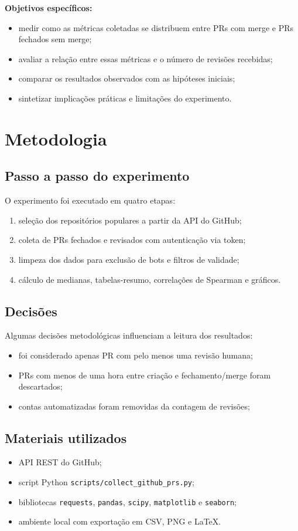 \documentclass[12pt,a4paper]{article}
\begin{document}
\textbf{Objetivos espec\'ificos:}
\begin{itemize}[leftmargin=1.5cm]
\item medir como as m\'etricas coletadas se distribuem entre PRs com merge e PRs fechados sem merge;
\item avaliar a rela\c{c}\~ao entre essas m\'etricas e o n\'umero de revis\~oes recebidas;
\item comparar os resultados observados com as hip\'oteses iniciais;
\item sintetizar implica\c{c}\~oes pr\'aticas e limita\c{c}\~oes do experimento.
\end{itemize}

\section{Metodologia}

\subsection{Passo a passo do experimento}
O experimento foi executado em quatro etapas:
\begin{enumerate}[leftmargin=1.5cm]
\item sele\c{c}\~ao dos reposit\'orios populares a partir da API do GitHub;
\item coleta de PRs fechados e revisados com autentica\c{c}\~ao via token;
\item limpeza dos dados para exclus\~ao de bots e filtros de validade;
\item c\'alculo de medianas, tabelas-resumo, correla\c{c}\~oes de Spearman e gr\'aficos.
\end{enumerate}

\subsection{Decis\~oes}
Algumas decis\~oes metodol\'ogicas influenciam a leitura dos resultados:
\begin{itemize}[leftmargin=1.5cm]
\item foi considerado apenas PR com pelo menos uma revis\~ao humana;
\item PRs com menos de uma hora entre cria\c{c}\~ao e fechamento/merge foram descartados;
\item contas automatizadas foram removidas da contagem de revis\~oes;
\end{itemize}

\subsection{Materiais utilizados}
\begin{itemize}[leftmargin=1.5cm]
\item API REST do GitHub;
\item script Python \texttt{scripts/collect\_github\_prs.py};
\item bibliotecas \texttt{requests}, \texttt{pandas}, \texttt{scipy}, \texttt{matplotlib} e \texttt{seaborn};
\item ambiente local com exporta\c{c}\~ao em CSV, PNG e LaTeX.
\end{itemize}
\end{document}
